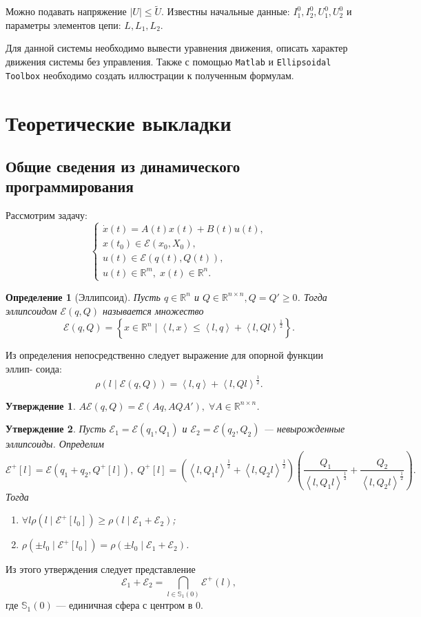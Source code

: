 \documentclass[11pt]{article}
\newtheorem{definition}{Определение}
\newtheorem{proposition}{Утверждение}
\newcommand\abs[1]{\left\lvert#1\right\rvert}
\newcommand{\scalar}[2]{\left<#1,#2\right>}
\begin{document}
Можно подавать напряжение $\abs{U} \leqslant \tilde{U}$. Известны начальные данные: $I_1^0, I_2^0, U_1^0, U_2^0$ и параметры элементов цепи: $L, L_1, L_2$.

Для данной системы необходимо вывести уравнения движения, описать характер движения системы без управления. Также с помощью \texttt{Matlab} и \texttt{Ellipsoidal Toolbox} необходимо создать иллюстрации к полученным формулам.
\section{Теоретические выкладки}
\subsection{Общие сведения из динамического программирования}
Рассмотрим задачу:
$$
\left\{
\begin{aligned}
\dot{x}(t) = A(t)x(t) + B(t)u(t), \\
x(t_0) \in \mathcal{E}(x_0, X_0), \\
u(t) \in \mathcal{E}(q(t), Q(t)), \\
u(t) \in \mathbb{R}^m, \; x(t) \in \mathbb{R}^n.
\end{aligned}\right.
$$

\begin{definition}[Эллипсоид]
Пусть $q \in \mathbb{R}^n$ и $Q \in \mathbb{R}^{n \times n}, Q = Q' \geqslant 0$. Тогда эллипсоидом $\mathcal{E}(q, Q)$ называется множество
$$
\mathcal{E}(q, Q) = \left\{ x \in \mathbb{R}^n \mid \scalar{l}{x} \leqslant \scalar{l}{q} + \scalar{l}{Ql}^{\tfrac{1}{2}} \right\}.
$$
\end{definition}

Из определения непосредственно следует выражение для опорной функции эллип-
соида:
$$
\rho(l \mid \mathcal{E}(q, Q)) = \scalar{l}{q} + \scalar{l}{Ql}^{\frac{1}{2}}.
$$

\begin{proposition}
$A\mathcal{E}(q, Q) = \mathcal{E}(Aq, AQA'), \; \forall A \in \mathbb{R}^{n \times n}$.
\end{proposition}

\begin{proposition}
Пусть $\mathcal{E}_1 = \mathcal{E}(q_1, Q_1)$ и $\mathcal{E}_2 = \mathcal{E}(q_2, Q_2)$ --- невырожденные эллипсоиды. Определим
$$
\mathcal{E}^+[l] = \mathcal{E}(q_1 + q_2, Q^+[l]), \; Q^+[l] = \left( \scalar{l}{Q_1 l}^{\frac{1}{2}} + \scalar{l}{Q_2 l}^{\frac{1}{2}} \right) \left( \frac{Q_1}{\scalar{l}{Q_1 l}^{\frac{1}{2}}} + \frac{Q_2}{\scalar{l}{Q_2 l}^{\frac{1}{2}}} \right).
$$
Тогда
\begin{enumerate}
\item $\forall l \rho(l \mid \mathcal{E}^+[l_0]) \geqslant \rho(l \mid \mathcal{E}_1 + \mathcal{E}_2)$;
\item $\rho(\pm l_0 \mid \mathcal{E}^+[l_0]) = \rho(\pm l_0 \mid \mathcal{E}_1 + \mathcal{E}_2)$.
\end{enumerate}
\end{proposition}
Из этого утверждения следует представление
$$
\mathcal{E}_1 + \mathcal{E}_2 = \bigcap\limits_{l \in \mathbb{S}_1(0)} \mathcal{E}^+(l),
$$
где $\mathbb{S}_1(0)$ --- единичная сфера с центром в $0$.
\end{document}
